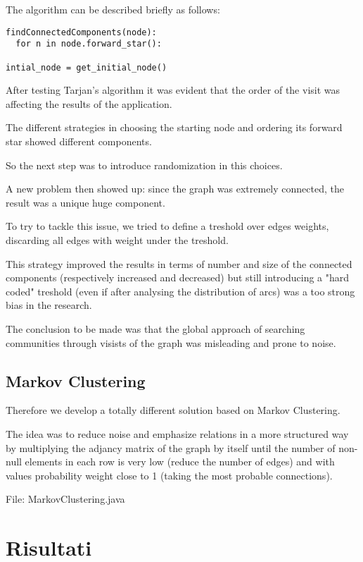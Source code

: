 \documentclass[10pt,a4paper]{article}
\begin{document}
The algorithm can be described briefly as follows:
\begin{verbatim}
findConnectedComponents(node):
  for n in node.forward_star():
     
intial_node = get_initial_node()
\end{verbatim}

After testing Tarjan's algorithm it was evident that the order of the visit
was affecting the results of the application.

The different strategies in choosing the starting node and ordering its forward
star showed different components.

So the next step was to introduce randomization in this choices.

A new problem then showed up: since the graph was extremely connected, the result
was a unique huge component.

To try to tackle this issue, we tried to define a treshold over edges weights, discarding all
edges with weight under the treshold.

This strategy improved the results in terms of number and size of the connected components
(respectively increased and decreased) but still introducing a "hard coded" treshold (even if
after analysing the distribution of arcs) was a too strong bias in the research.

The conclusion to be made was that the global approach of searching communities through visists
of the graph was misleading and prone to noise.

\subsection{Markov Clustering}

Therefore we develop a totally different solution based on Markov Clustering.

The idea was to reduce noise and emphasize relations in a more structured way
by multiplying the adjancy matrix of the graph by itself until the number of
non-null elements in each row is very low (reduce the number of edges) and with
values probability weight close to 1 (taking the most probable connections).

File: MarkovClustering.java



\section{Risultati}
\label{results}
\end{document}
